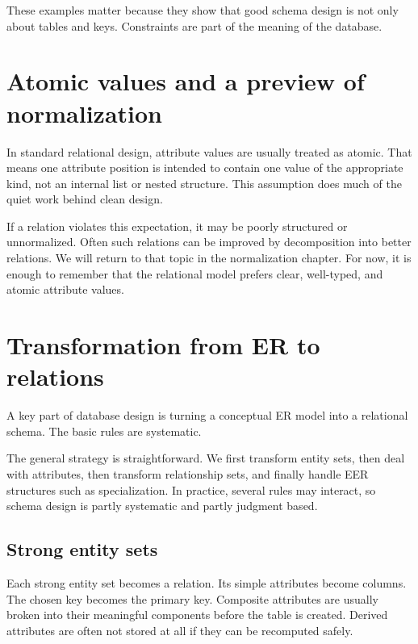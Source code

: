 \documentclass[11pt,a4paper,openany]{book}
\begin{document}
These examples matter because they show that good schema design is not only about tables and keys. Constraints are part of the meaning of the database.

\section{Atomic values and a preview of normalization}
In standard relational design, attribute values are usually treated as atomic. That means one attribute position is intended to contain one value of the appropriate kind, not an internal list or nested structure. This assumption does much of the quiet work behind clean design.

If a relation violates this expectation, it may be poorly structured or unnormalized. Often such relations can be improved by decomposition into better relations. We will return to that topic in the normalization chapter. For now, it is enough to remember that the relational model prefers clear, well-typed, and atomic attribute values.

\section{Transformation from ER to relations}
A key part of database design is turning a conceptual ER model into a relational schema. The basic rules are systematic.

The general strategy is straightforward. We first transform entity sets, then deal with attributes, then transform relationship sets, and finally handle EER structures such as specialization. In practice, several rules may interact, so schema design is partly systematic and partly judgment based.

\subsection{Strong entity sets}
Each strong entity set becomes a relation. Its simple attributes become columns. The chosen key becomes the primary key. Composite attributes are usually broken into their meaningful components before the table is created. Derived attributes are often not stored at all if they can be recomputed safely.
\end{document}
